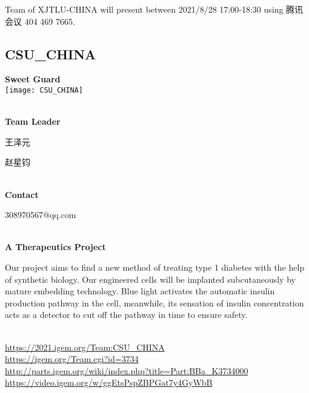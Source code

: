 \vfill{}









Team of XJTLU-CHINA will present between        2021/8/28 17:00-18:30 using 腾讯会议 404 469 7665.
\newpage


\subsection{\textcolor{Blu}{ CSU\_CHINA } }
\vspace{5mm}
\begin{center}
\large{
  \textbf{ Sweet Guard }\\

  \texttt{[image: CSU\_CHINA]}
}
\end{center}
\textbf{\\Team Leader}

  王泽元

  赵星钧


\textbf{\\Contact}

  308970567@qq.com


\textbf{\\A Therapeutics Project\\}\begin{spacing}{1.5}

Our project aims to find a new method of treating type 1 diabetes with the help of synthetic biology. Our engineered cells will be implanted subcutaneously by mature embedding technology. Blue light activates the automatic insulin production pathway in the cell, meanwhile, its sensation of insulin concentration acts as a detector to cut off the pathway in time to ensure safety.\end{spacing}
\\

\url{https://2021.igem.org/Team:CSU\_CHINA }\\
\url{https://igem.org/Team.cgi?id=3734 }\\
\url{http://parts.igem.org/wiki/index.php?title=Part:BBa_K3734000 }\\
\url{https://video.igem.org/w/ggEtsPspZBPGat7y4GyWbB }\\

\vfill{}









